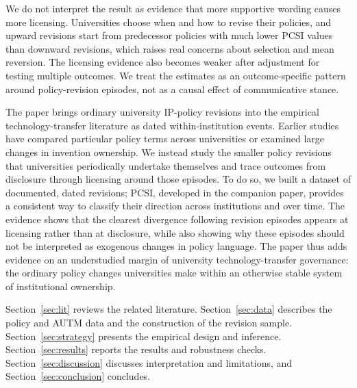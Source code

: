 We do not interpret the result as evidence that more supportive wording causes more licensing. Universities choose when and how to revise their policies, and upward revisions start from predecessor policies with much lower PCSI values than downward revisions, which raises real concerns about selection and mean reversion. The licensing evidence also becomes weaker after adjustment for testing multiple outcomes. We treat the estimates as an outcome-specific pattern around policy-revision episodes, not as a causal effect of communicative stance.

The paper brings ordinary university IP-policy revisions into the empirical technology-transfer literature as dated within-institution events. Earlier studies have compared particular policy terms across universities or examined large changes in invention ownership. We instead study the smaller policy revisions that universities periodically undertake themselves and trace outcomes from disclosure through licensing around those episodes. To do so, we built a dataset of documented, dated revisions; PCSI, developed in the companion paper, provides a consistent way to classify their direction across institutions and over time. The evidence shows that the clearest divergence following revision episodes appears at licensing rather than at disclosure, while also showing why these episodes should not be interpreted as exogenous changes in policy language. The paper thus adds evidence on an understudied margin of university technology-transfer governance: the ordinary policy changes universities make within an otherwise stable system of institutional ownership.

Section~\ref{sec:lit} reviews the related literature. Section~\ref{sec:data} describes the policy and AUTM data and the construction of the revision sample. Section~\ref{sec:strategy} presents the empirical design and inference. Section~\ref{sec:results} reports the results and robustness checks. Section~\ref{sec:discussion} discusses interpretation and limitations, and Section~\ref{sec:conclusion} concludes.
